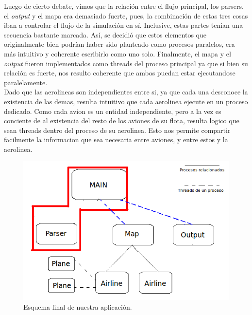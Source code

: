 \documentclass[a4paper,10pt]{article}
\begin{document}
 Luego de cierto debate, vimos que la relación entre el flujo principal, los parsers, el \textit{output} y el mapa era demasiado fuerte, pues, 
 la combinación de estas tres cosas iban a 
 controlar el flujo de la simulación en sí. Inclusive, estas partes tenian una secuencia bastante marcada. Así, se decidió que estos elementos que originalmente bien podrían haber 
 sido planteado como procesos paralelos, era más intuitivo y coherente escribirlo como uno solo.
 Finalmente, el mapa y el \textit{output} fueron implementados como threads del proceso principal ya que si bien su relación es fuerte, nos resulto coherente
  que ambos puedan estar ejecutandose paralelamente. \\

Dado que las aerolineas son independientes entre si, ya que cada una desconoce la existencia de las demas, resulta intuitivo que cada aerolinea ejecute en un proceso dedicado.
Como cada avion es un entidad independiente, pero a la vez es conciente de al existencia del resto de los aviones de su flota, resulta logico que sean threads dentro del proceso de su aerolinea.
Esto nos permite compartir facilmente la informacion que sea necesaria entre aviones, y entre estos y la aerolinea.

\begin{figure}[H]
\begin{center}
 \includegraphics[scale=0.6]{./images/Diagrama_simulacion_1.png}
 \caption{Esquema final de nuestra aplicación.}
\end{center}
\end{figure}

\newpage
\end{document}
